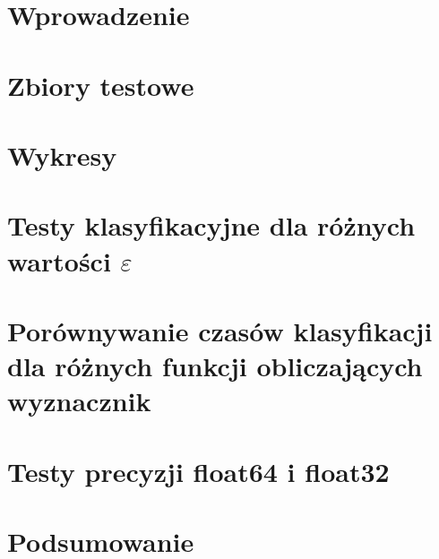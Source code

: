 \documentclass{sprawozdanie-agh}
\begin{document}

\stronatytulowa{}

\section{Wprowadzenie}

\section{Zbiory testowe}

\section{Wykresy}




\section{Testy klasyfikacyjne dla różnych wartości $\varepsilon$}


\section{Porównywanie czasów klasyfikacji dla różnych funkcji obliczających wyznacznik}
\section{Testy precyzji float64 i float32}
\section{Podsumowanie}
\end{document}
